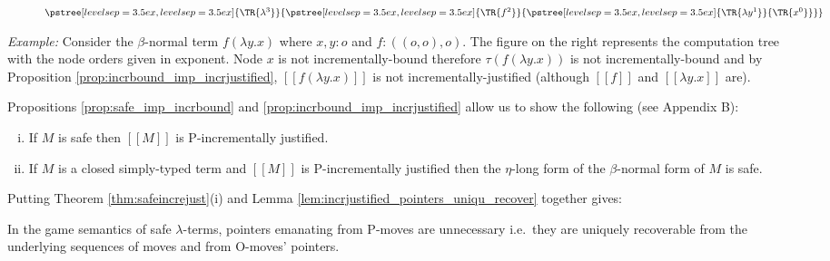 \documentclass{llncs}
\newcommand{\sem}[1]{{[\![ #1 ]\!]}}
\newcommand{\tree}[2][levelsep=3.5ex]{\pstree[levelsep=3.5ex,#1]{\TR{#2}}}
\begin{document}
\begin{wrapfigure}[5]{r}{0.6cm}
$
{\tree{\lambda^3}{\tree{f^2}{ \tree{\lambda y^1}{ \TR{x^0} }}}}$
\end{wrapfigure}
\noindent \emph{Example:} %
Consider the $\beta$-normal term $f (\lambda y .x)$ where $x,y:o$ and
$f:((o,o),o)$. The figure on the right represents the computation tree
with the node orders given in exponent.  Node $x$ is not
incrementally-bound therefore $\tau(f (\lambda y .x))$ is not
incrementally-bound and by Proposition
\ref{prop:incrbound_imp_incrjustified}, $\sem{f (\lambda y .x)}$ is
not incrementally-justified (although $\sem{f}$ and $\sem{\lambda
  y. x}$ are).

Propositions \ref{prop:safe_imp_incrbound} and
\ref{prop:incrbound_imp_incrjustified} allow us to show the following
(see Appendix B):

\begin{theorem}
\label{thm:safeincrejust}
\begin{enumerate}[(i)]
\item If $M$ is safe then $\sem{M}$ is P-incrementally justified.
\item If $M$ is a closed simply-typed term and $\sem{M}$ is
  P-incrementally justified then the $\eta$-long form of the
  $\beta$-normal form of $M$ is safe.
\end{enumerate}
\end{theorem}

Putting Theorem \ref{thm:safeincrejust}(i) and Lemma
\ref{lem:incrjustified_pointers_uniqu_recover} together gives:
\begin{proposition}
  \label{prop:safe_ptr_recoverable} In the game semantics of safe
  $\lambda$-terms, pointers emanating from P-moves are unnecessary
  i.e.\ they are uniquely recoverable from the underlying sequences of
  moves and from O-moves' pointers.
\end{proposition}

\end{document}
